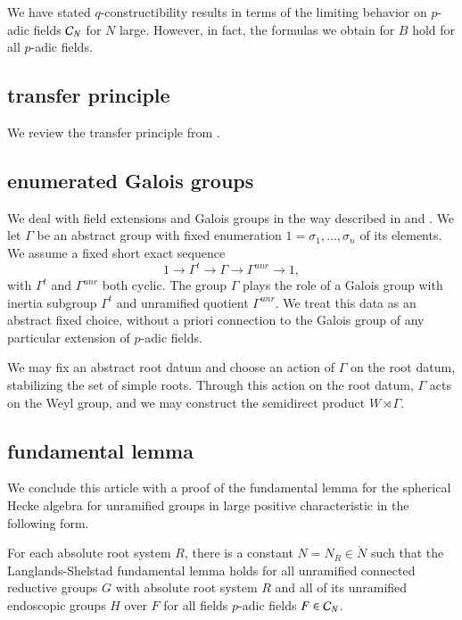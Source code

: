 \begin{remark}  
  We have stated $q$-constructibility results in terms of the limiting
  behavior on $p$-adic fields $\mathcal C_N$ for $N$ large.  However, in fact,
  the formulas we obtain for $B$ hold for all $p$-adic fields.
\end{remark}


\subsection{transfer principle}\label{sec:transfer}

We review the transfer principle from
\cite{cluckers2010constructible}.

\subsection{enumerated Galois groups}

We deal with field extensions and Galois groups in the way described
in \cite{gordon} and \cite{cluckers2011transfer}.  We let $\Gamma$ be
an abstract group with fixed enumeration $1=\sigma_1,\ldots,\sigma_n$
of its elements.  We assume a fixed short exact sequence
\[
1\to \Gamma^t\to\Gamma\to\Gamma^{unr}\to 1,
\]
with $\Gamma^t$ and $\Gamma^{unr}$ both cyclic.  The group $\Gamma$
plays the role of a Galois group with inertia subgroup $\Gamma^t$ and
unramified quotient $\Gamma^{unr}$.  We treat this data as an abstract
fixed choice, without a priori connection to the Galois group of any
particular extension of $p$-adic fields.

We may fix an abstract root datum and choose an action of $\Gamma$ on
the root datum, stabilizing the set of simple roots.  Through this
action on the root datum, $\Gamma$ acts on the Weyl group, and we may
construct the semidirect product $W\rtimes \Gamma$.


\subsection{fundamental lemma}

We conclude this article with a proof of the fundamental lemma for the
spherical Hecke algebra for unramified groups in large positive
characteristic in the following form.

\begin{theorem} \label{thm:fl} For each absolute root system $R$,
  there is a constant $N=N_R\in\ring{N}$ such that the
  Langlands-Shelstad fundamental lemma holds for all unramified
  connected reductive groups $G$ with absolute root system $R$ and all
  of its unramified endoscopic groups $H$ over $F$ for all fields
  $p$-adic fields $F\in \mathcal C_N$.
\end{theorem}

